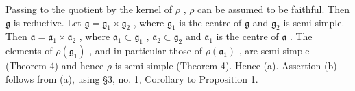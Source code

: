 Passing to the quotient by the kernel of \(\rho\) , \(\rho\) can be assumed to be faithful. Then \(\mathfrak{g}\) is reductive. Let \(\mathfrak{g} = \mathfrak{g}_1 \times \mathfrak{g}_2\) , where \(\mathfrak{g}_1\) is the centre of \(\mathfrak{g}\) and \(\mathfrak{g}_2\) is semi-simple. Then \(\mathfrak{a} = \mathfrak{a}_1 \times \mathfrak{a}_2\) , where \(\mathfrak{a}_1 \subset \mathfrak{g}_1\) , \(\mathfrak{a}_2 \subset \mathfrak{g}_2\) and \(\mathfrak{a}_1\) is the centre of \(\mathfrak{a}\) . The elements of \(\rho(\mathfrak{g}_1)\) , and in particular those of \(\rho(\mathfrak{a}_1)\) , are semi-simple (Theorem 4) and hence \(\rho\) is semi-simple (Theorem 4). Hence (a). Assertion (b) follows from (a), using §3, no. 1, Corollary to Proposition 1.

